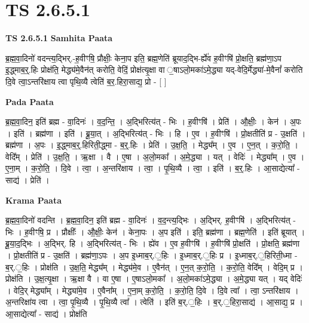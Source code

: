 \documentclass[17pt]{extarticle}
\begin{document}
\section*{ TS 2.6.5.1 }

\textbf{TS 2.6.5.1 } \newline
\textbf{Samhita Paata} \newline

ब्र॒ह्म॒वा॒दिनो॑ वदन्त्य॒द्भिर्.-ह॒वीꣳषि॒ प्रौक्षीः॒ केना॒प इति॒ ब्रह्म॒णेति॑ ब्रूयाद॒द्भि-र्ह्ये॑व ह॒वीꣳषि॑ प्रो॒क्षति॒ ब्रह्म॑णा॒ऽप इ॒द्ध्माब॒र्॒.हिः प्रोक्ष॑ति॒ मेद्ध्य॑मे॒वैन॑त् करोति॒ वेदिं॒ प्रोक्ष॑त्यृ॒क्षा वा ॒षाऽलो॒मका॑ऽमे॒द्ध्या यद्-वेदि॒र्मेद्ध्या॑-मे॒वैनां᳚ करोति दि॒वे त्वा॒ऽन्तरि॑क्षाय त्वा पृथि॒व्यै त्वेति॑ ब॒र॒.हिरा॒साद्य॒ प्रो - [  ] \newline

\textbf{Pada Paata} \newline

ब्र॒ह्म॒वा॒दिन॒ इति॑ ब्रह्म - वा॒दिनः॑ । व॒द॒न्ति॒ । अ॒द्भिरित्य॑त् - भिः । ह॒वीꣳषि॑ । प्रेति॑ । औ॒क्षीः॒ । केन॑ । अ॒पः । इति॑ । ब्रह्म॑णा । इति॑ । ब्रू॒या॒त् । अ॒द्भिरित्य॑त् - भिः । हि । ए॒व । ह॒वीꣳषि॑ । प्रो॒क्षतीति॑ प्र - उ॒क्षति॑ । ब्रह्म॑णा । अ॒पः । इ॒द्ध्माब॒र्॒.हिरिती॒द्ध्मा - ब॒र्॒.हिः । प्रेति॑ । उ॒क्ष॒ति॒ । मेद्ध्य᳚म् । ए॒व । ए॒न॒त् । क॒रो॒ति॒ । वेदि᳚म् । प्रेति॑ । उ॒क्ष॒ति॒ । ऋ॒क्षा । वै । ए॒षा । अ॒लो॒मका᳚ । अ॒मे॒द्ध्या । यत् । वेदिः॑ । मेद्ध्या᳚म् । ए॒व । ए॒ना॒म् । क॒रो॒ति॒ । दि॒वे । त्वा॒ । अ॒न्तरि॑क्षाय । त्वा॒ । पृ॒थि॒व्यै । त्वा॒ । इति॑ । ब॒र्॒.हिः । आ॒साद्येत्या᳚ - साद्य॑ । प्रेति॑ ।  \newline


\textbf{Krama Paata} \newline

ब्र॒ह्म॒वा॒दिनो॑ वदन्ति । ब्र॒ह्म॒वा॒दिन॒ इति॑ ब्रह्म - वा॒दिनः॑ । व॒द॒न्त्य॒द्भिः । अ॒द्भिर्. ह॒वीꣳषि॑ । अ॒द्भिरित्य॑त् - भिः । ह॒वीꣳषि॒ प्र । प्रौक्षीः᳚ । औ॒क्षीः॒ केन॑ । केना॒पः । अ॒प इति॑ । इति॒ ब्रह्म॑णा । ब्रह्म॒णेति॑ । इति॑ ब्रूयात् । ब्रू॒या॒द॒द्भिः । अ॒द्भिर्. हि । अ॒द्भिरित्य॑त् - भिः । ह्ये॑व । ए॒व ह॒वीꣳषि॑ । ह॒वीꣳषि॑ प्रो॒क्षति॑ । प्रो॒क्षति॒ ब्रह्म॑णा । प्रो॒क्षतीति॑ प्र - उ॒क्षति॑ । ब्रह्म॑णा॒ऽपः । अ॒प इ॒ध्माब॒र्.॒हिः । इ॒ध्माब॒र्.॒हिः प्र । इ॒ध्माब॒र्.॒हिरिती॒ध्मा - ब॒र्.॒हिः । प्रोक्ष॑ति । उ॒क्ष॒ति॒ मेद्ध्य᳚म् । मेद्ध्य॑मे॒व । ए॒वैन॑त् । ए॒न॒त् क॒रो॒ति॒ । क॒रो॒ति॒ वेदि᳚म् । वेदि॒म् प्र । प्रोक्ष॑ति । उ॒क्ष॒त्यृ॒क्षा । ऋ॒क्षा वै । वा ए॒षा । ए॒षाऽलो॒मका᳚ । अ॒लो॒मका॑ऽमे॒द्ध्या । अ॒मे॒द्ध्या यत् । यद् वेदिः॑ । वेदि॒र् मेद्ध्या᳚म् । मेद्ध्या॑मे॒व । ए॒वैना᳚म् । ए॒ना॒म् क॒रो॒ति॒ । क॒रो॒ति॒ दि॒वे । दि॒वे त्वा᳚ । त्वा॒ ऽन्तरि॑क्षाय । अ॒न्तरिक्षा॑य त्वा । त्वा॒ पृ॒थि॒व्यै । पृ॒थि॒व्यै त्वा᳚ । त्वेति॑ । इति॑ ब॒र्.॒हिः । ब॒र्.॒हिरा॒साद्य॑ । आ॒साद्य॒ प्र । आ॒साद्येत्या᳚ - साद्य॑ । प्रोक्ष॑ति \newline
\end{document}

